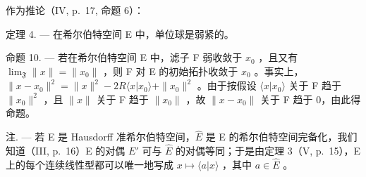 作为推论（IV, p.~17, 命题 6）：

定理 4. --- 在希尔伯特空间 E 中，单位球是弱紧的。

命题 10. --- 若在希尔伯特空间 E 中，滤子 F 弱收敛于 \(x_{0}\) ，且又有 \(\lim_{\mathfrak{F}} \|x\| = \|x_{0}\|\) ，则 F 对 E 的初始拓扑收敛于 \(x_{0}\) 。事实上，\(\|x - x_{0}\|^{2} = \|x\|^{2} - 2R \langle x|x_{0} \rangle + \|x_{0}\|^{2}\) 。由于按假设 \(\langle x|x_{0}\rangle\) 关于 F 趋于 \(\|x_{0}\|^{2}\) ，且 \(\|x\|\) 关于 F 趋于 \(\|x_{0}\|\) ，故 \(\|x - x_{0}\|\) 关于 F 趋于 0，由此得命题。

注. --- 若 E 是 Hausdorff 准希尔伯特空间，\(\hat{E}\) 是 E 的希尔伯特空间完备化，我们知道（III, p.~16）E 的对偶 \(E'\) 可与 \(\hat{E}\) 的对偶等同；于是由定理 3（V, p.~15），E 上的每个连续线性型都可以唯一地写成 \(x \mapsto \langle a|x\rangle\) ，其中 \(a \in \hat{E}\) 。

